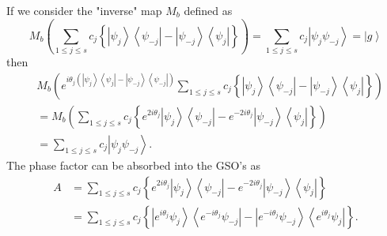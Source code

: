 \documentclass[aps,preprint]{revtex4}%
\begin{document}
If we consider the "inverse" map $M_{b}$ defined as
\begin{equation}
M_{b}\left(  \sum_{1\leq j\leq s}c_{j}\left\{  \left\vert \psi_{j}%
\right\rangle \left\langle \psi_{-j}\right\vert -\left\vert \psi
_{-j}\right\rangle \left\langle \psi_{j}\right\vert \right\}  \right)
=\sum_{1\leq j\leq s}c_{j}\left\vert \psi_{j}\psi_{-j}\right\rangle
=\left\vert g\right\rangle
\end{equation}
then
\begin{align}
&  M_{b}\left(  e^{i\theta_{j}\left(  \left\vert \psi_{j}\right\rangle
\left\langle \psi_{j}\right\vert -\left\vert \psi_{-j}\right\rangle
\left\langle \psi_{-j}\right\vert \right)  }\sum_{1\leq j\leq s}c_{j}\left\{
\left\vert \psi_{j}\right\rangle \left\langle \psi_{-j}\right\vert -\left\vert
\psi_{-j}\right\rangle \left\langle \psi_{j}\right\vert \right\}  \right)
\nonumber\\
&  =M_{b}\left(  \sum_{1\leq j\leq s}c_{j}\left\{  e^{2i\theta_{j}}\left\vert
\psi_{j}\right\rangle \left\langle \psi_{-j}\right\vert -e^{-2i\theta_{j}%
}\left\vert \psi_{-j}\right\rangle \left\langle \psi_{j}\right\vert \right\}
\right) \nonumber\\
&  =\sum_{1\leq j\leq s}c_{j}\left\vert \psi_{j}\psi_{-j}\right\rangle .
\end{align}
The phase factor can be absorbed into the GSO's as
\begin{align}
A  &  =\sum_{1\leq j\leq s}c_{j}\left\{  e^{2i\theta_{j}}\left\vert \psi
_{j}\right\rangle \left\langle \psi_{-j}\right\vert -e^{-2i\theta_{j}%
}\left\vert \psi_{-j}\right\rangle \left\langle \psi_{j}\right\vert \right\}
\nonumber\\
&  =\sum_{1\leq j\leq s}c_{j}\left\{  \left\vert e^{i\theta_{j}}\psi
_{j}\right\rangle \left\langle e^{-i\theta_{j}}\psi_{-j}\right\vert
-\left\vert e^{-i\theta_{j}}\psi_{-j}\right\rangle \left\langle e^{i\theta
_{j}}\psi_{j}\right\vert \right\}  .
\end{align}
\end{document}
